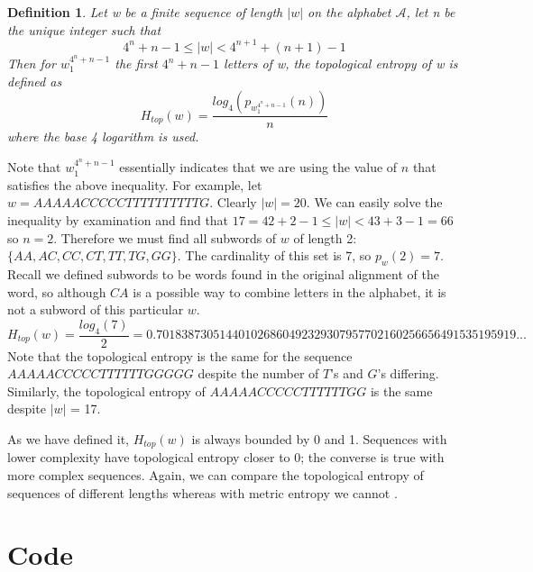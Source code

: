 \documentclass{article}
\newtheorem{definition}{Definition}
\begin{document}
\begin{definition}
    Let w be a finite sequence of length $|w|$ on the alphabet $\mathcal{A}$, let n be the unique integer such that
    \begin{equation*}
        4^n + n - 1 \leq |w| < 4^{n + 1} + (n + 1) - 1
    \end{equation*}
    Then for $w_1^{4^n + n - 1}$ the first $4^n + n - 1$ letters of w, the topological entropy of w is defined as
    \begin{equation*}
        H_{top}(w) = \frac{log_4(p_{w_1^{4^n+n-1}}(n))}{n}
    \end{equation*}
    where the base 4 logarithm is used.
\end{definition}
\noindent Note that $w_1^{4^n + n - 1}$ essentially indicates that we are using the value of $n$ that satisfies the above inequality.
For example, let $w = AAAAACCCCCTTTTTTTTTTG$.
Clearly $|w| = 20$.
We can easily solve the inequality by examination and find that $17 = 42 + 2 - 1 \leq |w| < 43 + 3 - 1 = 66$ so $n = 2$. 
Therefore we must find all subwords of $w$ of length 2: $\{AA, AC, CC, CT, T T, T G, GG\}$.
The cardinality of this set is 7, so $p_w(2) = 7$.
Recall we defined subwords to be words found in the original alignment of the word, so although $CA$ is a possible way to combine letters in the alphabet, it is not a subword of this particular $w$.
    \[H_{top}(w) = \frac{log_4(7)}{2} = 0.701838730514401026860492329307957702160256656491535195919...\]
Note that the topological entropy is the same for the sequence $AAAAACCCCCTTTTTTGGGGG$ despite the number of $T$'s and $G$'s differing.
Similarly, the topological entropy of $AAAAACCCCCTTTTTTGG$ is the same despite $|w|$ = 17.

As we have defined it, $H_{top}(w)$ is always bounded by 0 and 1.
Sequences with lower complexity have topological entropy closer to 0; the converse is true with more complex sequences.
Again, we can compare the topological entropy of sequences of different lengths whereas with metric entropy we cannot \cite{1}.

\section{Code}
\end{document}
